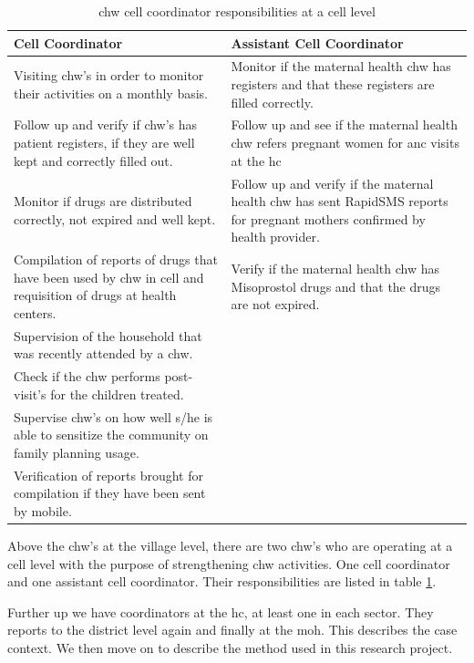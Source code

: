 \begin{table}
\centering
\begin{tabular}{|p{6cm}|p{6cm}|}
\hline
\large{Cell Coordinator} & \large{Assistant Cell Coordinator} \\
\hline
Visiting \gls{chw}'s in order to monitor their activities on a monthly basis. & Monitor if the maternal health \gls{chw} has registers and that these registers are filled correctly. \\
\hline
Follow up and verify if \gls{chw}'s has patient registers, if they are well kept and correctly filled out. & Follow up and see if the maternal health \gls{chw} refers pregnant women for \gls{anc} visits at the \gls{hc} \\
\hline
Monitor if drugs are distributed correctly, not expired and well kept. & Follow up and verify if  the maternal health \gls{chw} has sent RapidSMS reports for pregnant mothers confirmed by health provider.\\
\hline
Compilation of reports of drugs that have been used by \gls{chw} in cell and requisition of drugs at health centers. & Verify if the maternal health \gls{chw} has Misoprostol drugs and that the drugs are not expired. \\
\hline
Supervision of the household that was recently attended by a \gls{chw}. & \\
\cline{1-1}
Check if the \gls{chw} performs post-visit's for the children treated. & \\
\cline{1-1}
Supervise \gls{chw}'s on how well s/he is able to sensitize the community on family planning usage. & \\
\cline{1-1}
Verification of reports brought for compilation if they have been sent by mobile. & \\
\hline
\end{tabular}
\caption{\gls{chw} cell coordinator responsibilities at a cell level}
\label{table:cellcoordinator}
\end{table}

Above the \gls{chw}'s at the village level, there are two \gls{chw}'s who are operating at a cell level with the purpose of strengthening \gls{chw} activities. One cell coordinator and one assistant cell coordinator. Their responsibilities are listed in table \ref{table:cellcoordinator}.

Further up we have coordinators at the \gls{hc}, at least one in each sector. 
They reports to the district level again and finally at the \gls{moh}. 
This describes the case context. We then move on to describe the method used in this research project. 
